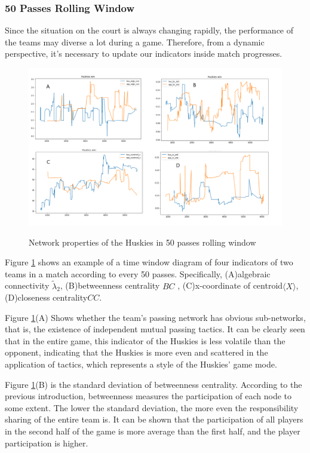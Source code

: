 \documentclass{mcmthesis}
\begin{document}
\subsubsection{50 Passes Rolling Window}

Since the situation on the court is always changing rapidly, the performance of the teams may diverse a lot during a game. Therefore, from a dynamic perspective, it's necessary to update our indicators inside match progresses. \cite{1}
\begin{figure}[htbp]
  \centering
  \caption{Network properties of the Huskies in 50 passes rolling window}
  \includegraphics[width=15cm]{temporal.png}
  \label{temporal}
\end{figure}

Figure \ref{temporal} shows an example of a time window diagram of four indicators of two teams in a match according to every 50 passes. Specifically, (A)algebraic connectivity $\tilde\lambda_2$, (B)betweenness centrality $BC$ , (C)x-coordinate of centroid$\langle X\rangle$, (D)closeness centrality$CC$.

Figure \ref{temporal}(A) Shows whether the team's passing network has obvious sub-networks, that is, the existence of independent mutual passing tactics. It can be clearly seen that in the entire game, this indicator of the Huskies is less volatile than the opponent, indicating that the Huskies is more even and scattered in the application of tactics, which represents a style of the Huskies' game mode.

Figure \ref{temporal}(B) is the standard deviation of betweenness centrality. According to the previous introduction, betweenness measures the participation of each node to some extent. The lower the standard deviation, the more even the responsibility sharing of the entire team is. It can be shown that the participation of all players in the second half of the game is more average than the first half, and the player participation is higher.
\end{document}
